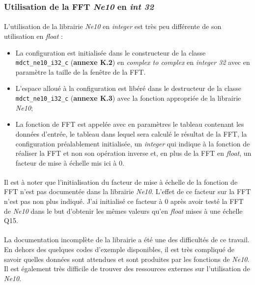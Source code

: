 \documentclass{article}
\begin{document}
    \subsubsection{Utilisation de la FFT \emph{Ne10} en \emph{int 32}}
    \paragraph{}
    L'utilisation de la librairie \emph{Ne10} en \emph{integer} est très peu différente de son utilisation en \emph{float} :
    \begin{itemize}
        \item La configuration est initialisée dans le constructeur de la classe \texttt{mdct\_ne10\_i32\_c} (\textbf{annexe 
        K.2}) en \emph{complex to complex} en \emph{integer 32} avec en paramètre la taille de la fenêtre de la FFT.
        \item L'espace alloué à la configuration est libéré dans le destructeur de la classe \texttt{mdct\_ne10\_i32\_c} (\textbf{annexe K.3}) avec la fonction appropriée de la librairie \emph{Ne10};
        \item La fonction de FFT est appelée avec en paramètres le tableau contenant les données d'entrée, le tableau dans lequel sera calculé le résultat de la FFT, la configuration préalablement initialisée, un \emph{integer} qui indique à la fonction de réaliser la FFT et non son opération inverse et, en plus de la FFT en \emph{float}, un facteur de mise à échelle mis ici à $0$.
    \end{itemize}

    \paragraph{}
    Il est à noter que l'initialisation du facteur de mise à échelle de la fonction de FFT n'est pas documentée dans la librairie \emph{Ne10}. L'effet de ce facteur sur la FFT n'est pas non plus indiqué. J'ai initialisé ce facteur à 0 après avoir testé la FFT de \emph{Ne10} dans le but d'obtenir les mêmes valeurs qu'en \emph{float} mises à une échelle Q15.

    \paragraph{}
    La documentation incomplète de la librairie a été une des difficultés de ce travail. En dehors des quelques codes d'exemple disponibles, il est très compliqué de savoir quelles données sont attendues et sont produites par les fonctions de \emph{Ne10}. Il est également très difficile de trouver des ressources externes sur l'utilisation de \emph{Ne10}.
\end{document}
